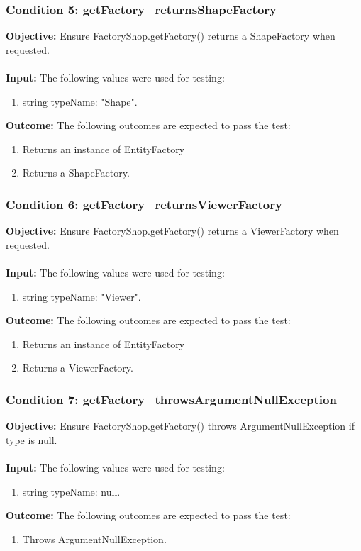 \documentclass[a4paper,12pt]{article}
\begin{document}
		\subsubsection{Condition 5: getFactory\_returnsShapeFactory}
			\textbf{Objective:} Ensure FactoryShop.getFactory() returns a ShapeFactory when requested.\\\\
			\textbf{Input:} The following values were used for testing:
				\begin{enumerate}
					\item string typeName: "Shape".
				\end{enumerate}
			\textbf{Outcome:} The following outcomes are expected to pass the test:
				\begin{enumerate}
					\item Returns an instance of EntityFactory
					\item Returns a ShapeFactory.
				\end{enumerate}
		\subsubsection{Condition 6: getFactory\_returnsViewerFactory}
			\textbf{Objective:} Ensure FactoryShop.getFactory() returns a ViewerFactory when requested.\\\\
			\textbf{Input:} The following values were used for testing:
				\begin{enumerate}
					\item string typeName: "Viewer".
				\end{enumerate}
			\textbf{Outcome:} The following outcomes are expected to pass the test:
				\begin{enumerate}
					\item Returns an instance of EntityFactory
					\item Returns a ViewerFactory.
				\end{enumerate}
		\subsubsection{Condition 7: getFactory\_throwsArgumentNullException}
			\textbf{Objective:} Ensure FactoryShop.getFactory() throws ArgumentNullException if type is null.\\\\
			\textbf{Input:} The following values were used for testing:
				\begin{enumerate}
					\item string typeName: null.
				\end{enumerate}
			\textbf{Outcome:} The following outcomes are expected to pass the test:
				\begin{enumerate}
					\item Throws ArgumentNullException.
				\end{enumerate}
\end{document}
